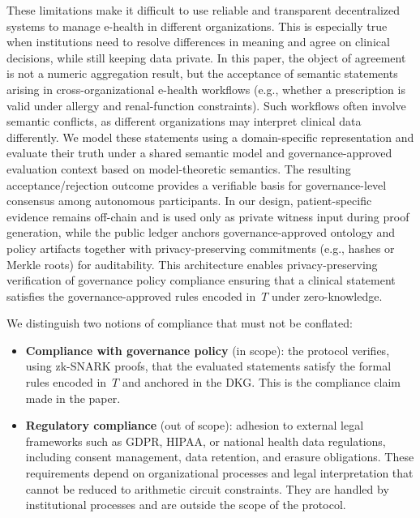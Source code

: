 \documentclass[journal]{IEEEtran}
\begin{document}
These limitations make it difficult to use reliable and transparent decentralized systems to manage e-health in different organizations. This is especially true when institutions need to resolve differences in meaning and agree on clinical decisions, while still keeping data private. In this paper, the object of agreement is not a numeric aggregation result, but the acceptance of semantic statements arising in cross-organizational e-health workflows (e.g., whether a prescription is valid under allergy and renal-function constraints). Such workflows often involve semantic conflicts, as different organizations may interpret clinical data differently. We model these statements using a domain-specific representation and evaluate their truth under a shared semantic model and governance-approved evaluation context based on model-theoretic semantics. The resulting acceptance/rejection outcome provides a verifiable basis for governance-level consensus among autonomous participants. In our design, patient-specific evidence remains off-chain and is used only as private witness input during proof generation, while the public ledger anchors governance-approved ontology and policy artifacts together with privacy-preserving commitments (e.g., hashes or Merkle roots) for auditability. This architecture enables privacy-preserving verification of governance policy compliance ensuring that a clinical statement satisfies the governance-approved rules encoded in~$T$ under zero-knowledge.

We distinguish two notions of compliance that must not be conflated:

\begin{itemize}
  \item \textbf{Compliance with governance policy} (in scope): the protocol verifies, using zk-SNARK proofs, that the evaluated statements satisfy the formal rules encoded in~$T$ and anchored in the DKG. This is the compliance claim made in the paper.
  \item \textbf{Regulatory compliance} (out of scope): adhesion to external legal frameworks such as GDPR, HIPAA, or national health data regulations, including consent management, data retention, and erasure obligations. These requirements depend on organizational processes and legal interpretation that cannot be reduced to arithmetic circuit constraints. They are handled by institutional processes and are outside the scope of the protocol.
\end{itemize}
\end{document}
